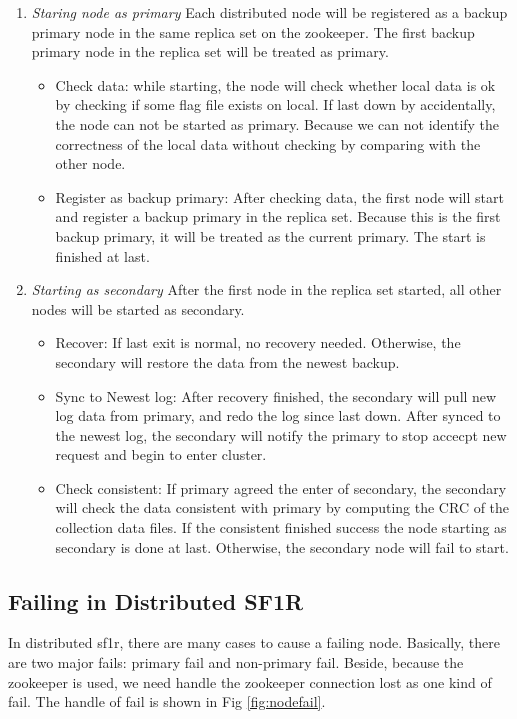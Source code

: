 \begin{enumerate}
 \item \emph{Staring node as primary}\newline
Each distributed node will be registered as a backup primary node in the same replica set on the zookeeper. The first backup primary node in the replica set will be treated as primary.

  \begin{itemize}
   \item Check data: while starting, the node will check whether local data is ok by checking if some flag file exists on local. If last down by accidentally, the node can not be started as primary. Because we can not identify the correctness of the local data without checking by comparing with the other node.
   \item Register as backup primary: After checking data, the first node will start and register a backup primary in the replica set. Because this is the first backup primary, it will be treated as the current primary. The start is finished at last.
  \end{itemize}

 \item \emph{Starting as secondary}\newline
After the first node in the replica set started, all other nodes will be started as secondary.

 \begin{itemize}
 \item Recover: If last exit is normal, no recovery needed. Otherwise, the secondary will restore the data from the newest backup.
 \item Sync to Newest log: After recovery finished, the secondary will pull new log data from primary, and redo the log since last down. After synced to the newest log, the secondary will notify the primary to stop accecpt new request and begin to enter cluster.
 \item Check consistent: If primary agreed the enter of secondary, the secondary will check the data consistent with primary by computing the CRC of the collection data files. If the consistent finished success the node starting as secondary is done at last. Otherwise, the secondary node will fail to start.
 \end{itemize}
 
\end{enumerate}

\subsection{Failing in Distributed SF1R}
In distributed sf1r, there are many cases to cause a failing node. Basically, there are two major fails: primary fail and non-primary fail. Beside, because the zookeeper is used, we need handle the zookeeper connection lost as one kind of fail. The handle of fail is shown in Fig \ref{fig:nodefail}.
